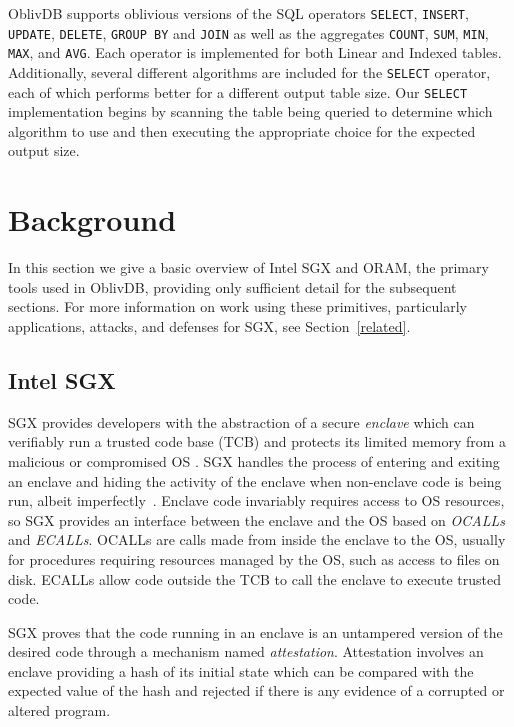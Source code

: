 \documentclass[letterpaper,twocolumn,10pt]{article}
\def\name/{OblivDB}
\begin{document}
  \name/ supports oblivious versions of the SQL operators \texttt{SELECT}, \texttt{INSERT}, \texttt{UPDATE}, \texttt{DELETE}, \texttt{GROUP BY} and \texttt{JOIN} as well as the aggregates \texttt{COUNT}, \texttt{SUM}, \texttt{MIN}, \texttt{MAX}, and \texttt{AVG}. Each operator is implemented for both Linear and Indexed tables. Additionally, several different algorithms are included for the \texttt{SELECT} operator, each of which performs better for a different output table size. Our \texttt{SELECT} implementation begins by scanning the table being queried to determine which algorithm to use and then executing the appropriate choice for the expected output size. 

\section{Background}\label{background}
In this section we give a basic overview of Intel SGX and ORAM, the primary tools used in \name/, providing only sufficient detail for the subsequent sections. For more information on work using these primitives, particularly applications, attacks, and defenses for SGX, see Section~\ref{related}.

\subsection{Intel SGX}

SGX provides developers with the abstraction of a secure \textit{enclave} which can verifiably run a trusted code base (TCB) and protects its limited memory from a malicious or compromised OS \cite{CD16, SGXRef}. SGX handles the process of entering and exiting an enclave and hiding the activity of the enclave when non-enclave code is being run, albeit imperfectly~\cite{LSG+16}. Enclave code invariably requires access to OS resources, so SGX provides an interface between the enclave and the OS based on \textit{OCALLs} and \textit{ECALLs}. OCALLs are calls made from inside the enclave to the OS, usually for procedures requiring resources managed by the OS, such as access to files on disk. ECALLs allow code outside the TCB to call the enclave to execute trusted code. 

SGX proves that the code running in an enclave is an untampered version of the desired code through a mechanism named \textit{attestation}. Attestation involves an enclave providing a hash of its initial state which can be compared with the expected value of the hash and rejected if there is any evidence of a corrupted or altered program. 
\end{document}
